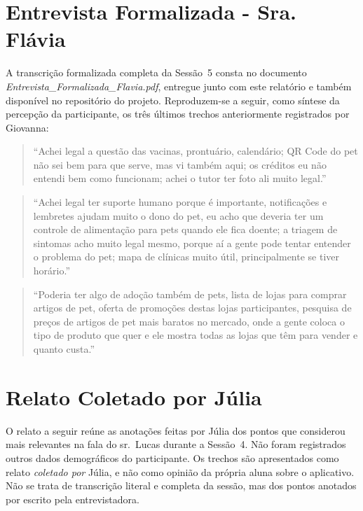 \documentclass[
    12pt,
    openright,
    oneside,
    a4paper
]{abntex2}
\begin{document}
\chapter{Entrevista Formalizada - Sra. Flávia}
\label{apx:flavia}

\begin{sloppypar}
A transcrição formalizada completa da Sessão~5 consta no documento
\textit{Entrevista\_Formalizada\_Flavia.pdf}, entregue junto com este relatório e também
disponível no repositório do projeto. Reproduzem-se a seguir, como síntese da percepção da
participante, os três últimos trechos anteriormente registrados por Giovanna:
\end{sloppypar}

\begin{quote}
\enquote{Achei legal a questão das vacinas, prontuário, calendário; QR Code do pet não sei bem
para que serve, mas vi também aqui; os créditos eu não entendi bem como funcionam; achei o
tutor ter foto ali muito legal.}
\end{quote}
\begin{quote}
\enquote{Achei legal ter suporte humano porque é importante, notificações e lembretes ajudam
muito o dono do pet, eu acho que deveria ter um controle de alimentação para pets quando ele
fica doente; a triagem de sintomas acho muito legal mesmo, porque aí a gente pode tentar
entender o problema do pet; mapa de clínicas muito útil, principalmente se tiver horário.}
\end{quote}
\begin{quote}
\enquote{Poderia ter algo de adoção também de pets, lista de lojas para comprar artigos de
pet, oferta de promoções destas lojas participantes, pesquisa de preços de artigos de pet
mais baratos no mercado, onde a gente coloca o tipo de produto que quer e ele mostra todas as
lojas que têm para vender e quanto custa.}
\end{quote}

\chapter{Relato Coletado por Júlia}
\label{apx:relatos}

O relato a seguir reúne as anotações feitas por Júlia dos pontos que considerou mais
relevantes na fala do sr.~Lucas durante a Sessão~4. Não foram registrados outros dados
demográficos do participante. Os trechos são apresentados como relato \emph{coletado por}
Júlia, e não como opinião da própria aluna sobre o aplicativo. Não se trata de transcrição
literal e completa da sessão, mas dos pontos anotados por escrito pela entrevistadora.
\end{document}
